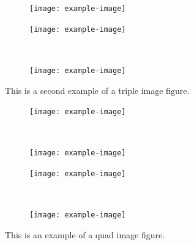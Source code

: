 \documentclass[12pt, letterpaper]{article}
\begin{document}
			\begin{figure}[!htb]
				\centering
				\hspace*{\fill}%
				\begin{subfigure}{\textwidth+1em\relax} %
					\texttt{[image: example-image]}
					\caption{} %
					\label{fig:tripleImage:a}
				\end{subfigure}
				\hspace*{\fill} %
				\par\vspace{1em}%
				\begin{subfigure}{0.45\textwidth}
					\texttt{[image: example-image]}
					\caption{} %
					\label{fig:tripleImage:b}
				\end{subfigure}
				~ %
				\begin{subfigure}{0.45\textwidth}
					\texttt{[image: example-image]}
					\caption{} %
					\label{fig:tripleImage:c}
				\end{subfigure}
				\caption{This is a second example of a triple image figure.}
				\label{fig:tripleImage}
			\end{figure}

			\begin{figure}[!htb]
				\centering
				\begin{subfigure}{0.45\textwidth}
					\texttt{[image: example-image]}
					\caption{} %
					\label{fig:quadImage:a}
				\end{subfigure}
				~ %
				\begin{subfigure}{0.45\textwidth}
					\texttt{[image: example-image]}
					\caption{} %
					\label{fig:quadImage:b}
				\end{subfigure}
				\par\vspace{1em} %
				\begin{subfigure}{0.45\textwidth}
					\texttt{[image: example-image]}
					\caption{} %
					\label{fig:quadImage:c}
				\end{subfigure}
				~ %
				\begin{subfigure}{0.45\textwidth}
					\texttt{[image: example-image]}
					\caption{} %
					\label{fig:quadImage:d}
				\end{subfigure}
				\caption{This is an example of a quad image figure.}
				\label{fig:quadImage}
			\end{figure}
\end{document}
